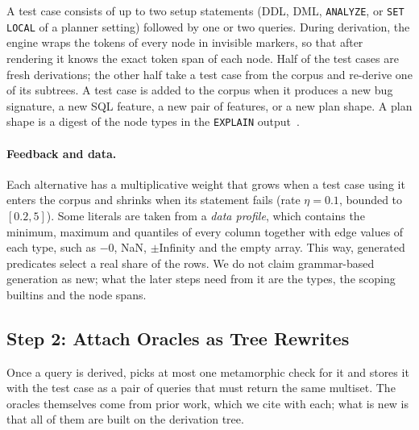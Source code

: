 A test case consists of up to two setup statements (DDL, DML, \texttt{ANALYZE},
or \texttt{SET LOCAL} of a planner setting) followed by one or two queries.
During derivation, the engine wraps the tokens of every node in invisible
markers, so that after rendering it knows the exact token span of each node.
Half of the test cases are fresh derivations; the other half take a test case
from the corpus and re-derive one of its subtrees. A test case is added to the
corpus when it produces a new bug signature, a new SQL feature, a new pair of
features, or a new plan shape. A plan shape is a digest of the node types in the
\texttt{EXPLAIN} output~\cite{ba2023qpg}.

\paragraph{Feedback and data.} Each alternative has a multiplicative weight
that grows when a test case using it enters the corpus and shrinks when its
statement fails (rate $\eta=0.1$, bounded to $[0.2,5]$). Some literals are taken
from a \emph{data profile}, which contains the minimum, maximum and quantiles of
every column together with edge values of each type, such as $-0$, NaN,
$\pm$Infinity and the empty array. This way, generated predicates select a
real share of the rows. We do not claim grammar-based generation as new; what
the later steps need from it are the types, the scoping builtins and the node
spans.

\subsection{Step 2: Attach Oracles as Tree Rewrites}
\label{sec:oracles}

Once a query is derived, \tool picks at most one metamorphic check for it and
stores it with the test case as a pair of queries that must return the same
multiset. The oracles themselves come from prior work, which we cite with each;
what is new is that all of them are built on the derivation tree.

